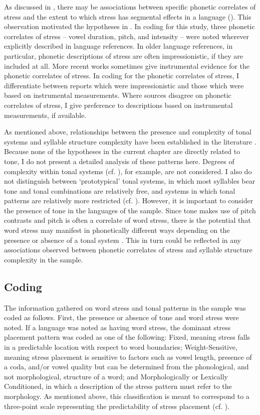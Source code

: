   As discussed in , there may be associations between specific phonetic correlates of stress and the extent to which stress has segmental effects in a language (\citealt{BybeeEtAl1998,Schiering2007}). This observation motivated the hypotheses in . In coding for this study, three phonetic correlates of stress -- vowel duration, pitch, and intensity -- were noted wherever explicitly described in language references. In older language references, in particular, phonetic descriptions of stress are often impressionistic, if they are included at all. More recent works sometimes give instrumental evidence for the phonetic correlates of stress. In coding for the phonetic correlates of stress, I differentiate between reports which were impressionistic and those which were based on instrumental measurements. Where sources disagree on phonetic correlates of stress, I give preference to descriptions based on instrumental measurements, if available.

  As mentioned above, relationships between the presence and complexity of tonal systems and syllable structure complexity have been established in the literature \citep{Maddieson2013d}. Because none of the hypotheses in the current chapter are directly related to tone, I do not present a detailed analysis of these patterns here. Degrees of complexity within tonal systems (cf. \citealt{Maddieson2013d}), for example, are not considered. I also do not distinguish between ‘prototypical’ tonal systems, in which most syllables bear tone and tonal combinations are relatively free, and systems in which tonal patterns are relatively more restricted (cf. \citealt{Hyman2009}). However, it is important to consider the presence of tone in the languages of the sample. Since tone makes use of pitch contrasts and pitch is often a correlate of word stress, there is the potential that word stress may manifest in phonetically different ways depending on the presence or absence of a tonal system \citep{Gordon2011}. This in turn could be reflected in any associations observed between phonetic correlates of stress and syllable structure complexity in the sample. 

\subsection{Coding}\label{sec:5.2.2}

  The information gathered on word stress and tonal patterns in the sample was coded as follows. First, the presence or absence of tone and word stress were noted. If a language was noted as having word stress, the dominant stress placement pattern was coded as one of the following: Fixed, meaning stress falls in a predictable location with respect to word boundaries; Weight-Sensitive, meaning stress placement is sensitive to factors such as vowel length, presence of a coda, and/or vowel quality but can be determined from the phonological, and not morphological, structure of a word; and Morphologically or Lexically Conditioned, in which a description of the stress pattern must refer to the morphology. As mentioned above, this classification is meant to correspond to a three-point scale representing the predictability of stress placement (cf. \citealt{Schiering2007}). 

